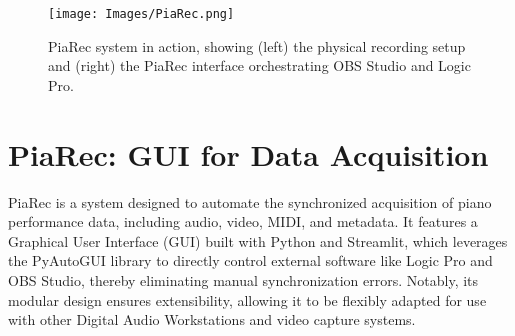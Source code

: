 \documentclass{article}
\begin{document}
\begin{figure}
    \centering
    \texttt{[image: Images/PiaRec.png]}
    \caption{PiaRec system in action, showing (left) the physical recording setup and (right) the PiaRec interface orchestrating OBS Studio and Logic Pro.}
    \vspace{-5mm}
    \label{fig:piarec}
\end{figure}

\section{PiaRec: GUI for Data Acquisition}


PiaRec is a system designed to automate the synchronized acquisition of piano performance data, including audio, video, MIDI, and metadata. It features a Graphical User Interface (GUI) built with Python and Streamlit, which leverages the PyAutoGUI library to directly control external software like Logic Pro and OBS Studio, thereby eliminating manual synchronization errors. Notably, its modular design ensures extensibility, allowing it to be flexibly adapted for use with other Digital Audio Workstations and video capture systems.

\end{document}
